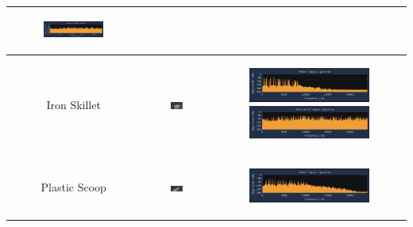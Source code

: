 \documentclass[12pt]{article}
\begin{document}
\begin{table}[!ht]
\begin{tabular}{|c|c|c|}
\begin{subfigure}{0.3\linewidth}
    \includegraphics[width=\linewidth]{images/impacts/IronMortarReal.png}
  \end{subfigure} \\ \hline
  Iron Skillet & \includegraphics[width=0.2\textwidth]{images/impacts/IronSkilletMesh.png} & 
  \begin{subfigure}{0.3\linewidth}
    \includegraphics[width=\linewidth]{images/impacts/IronSkilletModal.png}
    \includegraphics[width=\linewidth]{images/impacts/IronSkilletReal.png}
  \end{subfigure} \\ \hline
  Plastic Scoop & \includegraphics[width=0.2\textwidth]{images/impacts/PlasticScoopMesh.png} & 
  \begin{subfigure}{0.3\linewidth}
    \includegraphics[width=\linewidth]{images/impacts/PlasticScoopModal.png}

\end{subfigure}
\end{tabular}
\end{table}
\end{document}
